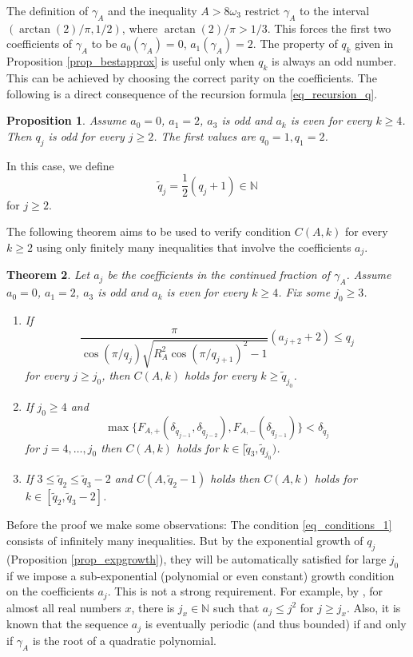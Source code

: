 \documentclass{amsart}
\def \N{\mathbb N}
\newtheorem{theorem}{Theorem}
\newtheorem{proposition}[theorem]{Proposition}
\begin{document}
The definition of $\gamma_A$ and the inequality $A > 8 \omega_3$ restrict $\gamma_A$ to the interval $(\arctan(2)/\pi, 1/2)$, where $\arctan(2)/\pi > 1/3$.
This forces the first two coefficients of $\gamma_A$ to be $a_0(\gamma_A) = 0$, $a_1(\gamma_A) = 2$.
The property of $q_k$ given in Proposition \ref{prop_bestapprox} is useful only when $q_k$ is always an odd number. This can be achieved by choosing the correct parity on the coefficients.
The following is a direct consequence of the recursion formula \eqref{eq_recursion_q}.
\begin{proposition}
	\label{prop_parity}
		Assume $a_0=0$, $a_1=2$, $a_3$ is odd and $a_k$ is even for every $k \geq 4$.
		Then $q_j$ is odd for every $j \geq 2$.
		The first values are $q_0 = 1, q_1 = 2$.
\end{proposition}
In this case, we define
\begin{equation}
	\label{eq_tilde}
	\tilde q_j = \frac 12(q_j + 1) \in \N
\end{equation}
for $j \geq 2$.

The following theorem aims to be used to verify condition $C(A,k)$ for every $k \geq 2$ using only finitely many inequalities that involve the coefficients $a_j$.
	\begin{theorem}
		\label{thm_estimates}
		Let $a_j$ be the coefficients in the continued fraction of $\gamma_A$.
		Assume $a_0=0$, $a_1=2$, $a_3$ is odd and $a_k$ is even for every $k \geq 4$.
		Fix some $j_0 \geq 3$.

		\begin{enumerate}[label = (\alph*), ref = \alph* ]
			\item
			\label{eq_conditions_1}
			If 
				\[\frac{\pi}{\cos(\pi / q_j) \sqrt{R_A^2 \cos(\pi / q_{j+1})^2 - 1}} (a_{j+2}+2) \leq q_j\]
			 for every $j \geq j_0$, then
			$C(A,k)$ holds for every $k \geq \tilde q_{j_0}$.

			\item 
			\label{eq_conditions_2}
			If $j_0 \geq 4$ and 
			\[\max\{F_{A,+}(\delta_{\tilde q_{j-1}}, \delta_{\tilde q_{j-2}}), F_{A,-}(\delta_{\tilde q_{j-1}})\} < \delta_{\tilde q_j}\]
			for $j = 4, \ldots, j_0$ then $C(A,k)$ holds for $k \in [\tilde q_3, \tilde q_{j_0})$.

			\item 
			\label{eq_conditions_3}
			If $3 \leq \tilde q_2 \leq \tilde q_3-2$ and $C(A,\tilde q_2-1)$ holds then $C(A,k)$ holds for $k \in [\tilde q_2, \tilde q_3-2]$.
		\end{enumerate}
	\end{theorem}
Before the proof we make some observations:
The condition \eqref{eq_conditions_1} consists of infinitely many inequalities.
But by the exponential growth of $q_j$ (Proposition \ref{prop_expgrowth}), they will be automatically satisfied for large $j_0$ if we impose a sub-exponential (polynomial or even constant) growth condition on the coefficients $a_j$.
This is not a strong requirement. For example, by \cite[Theorem 30]{khinchin1964continued}, for almost all real numbers $x$, there is $j_x \in \N$ such that $a_j \leq j^2$ for $j \geq j_x$.
Also, it is known that the sequence $a_j$ is eventually periodic (and thus bounded) if and only if $\gamma_A$ is the root of a quadratic polynomial.
\end{document}
